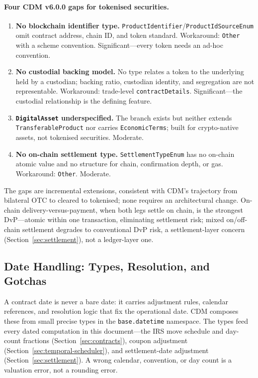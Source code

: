 \paragraph{Four CDM v6.0.0 gaps for tokenised securities.}
\begin{enumerate}[nosep]
\item \textbf{No blockchain identifier type.} \texttt{ProductIdentifier}/\texttt{ProductIdSourceEnum} omit contract address, chain ID, and token standard. Workaround: \texttt{Other} with a scheme convention. Significant---every token needs an ad-hoc convention.
\item \textbf{No custodial backing model.} No type relates a token to the underlying held by a custodian; backing ratio, custodian identity, and segregation are not representable. Workaround: trade-level \texttt{contractDetails}. Significant---the custodial relationship is the defining feature.
\item \textbf{\texttt{DigitalAsset} underspecified.} The branch exists but neither extends \texttt{Transferable\allowbreak Product} nor carries \texttt{EconomicTerms}; built for crypto-native assets, not tokenised securities. Moderate.
\item \textbf{No on-chain settlement type.} \texttt{SettlementTypeEnum} has no on-chain atomic value and no structure for chain, confirmation depth, or gas. Workaround: \texttt{Other}. Moderate.
\end{enumerate}
The gaps are incremental extensions, consistent with CDM's trajectory from bilateral OTC to cleared to tokenised; none requires an architectural change. On-chain delivery-versus-payment, when both legs settle on chain, is the strongest DvP---atomic within one transaction, eliminating settlement risk; mixed on/off-chain settlement degrades to conventional DvP risk, a settlement-layer concern (Section~\ref{sec:settlement}), not a ledger-layer one.

\subsection{Date Handling: Types, Resolution, and Gotchas}
\label{sec:cdm-dates}

A contract date is never a bare date: it carries adjustment rules, calendar references, and resolution logic that fix the operational date. CDM composes these from small precise types in the \texttt{base.datetime} namespace. The types feed every dated computation in this document---the IRS move schedule and day-count fractions (Section~\ref{sec:contracts}), coupon adjustment (Section~\ref{sec:temporal-scheduler}), and settlement-date adjustment (Section~\ref{sec:settlement}). A wrong calendar, convention, or day count is a valuation error, not a rounding error.

